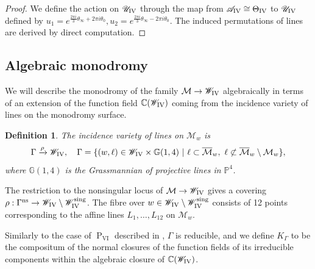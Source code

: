 \documentclass[a4paper,reqno]{amsart}
\numberwithin{equation}{section}
\newcommand{\C}{\mathbb{C}}
\newcommand{\p}{\mathbb{P}}
\newcommand{\pain}[1]{\operatorname{P}_{\mathrm{#1}}}
\newtheorem{definition}[theorem]{Definition}
\numberwithin{equation}{section}
\begin{document}
\begin{proof}
     
    We define the action on $\mathscr{U}_{\rm{IV}}$ through the map from $\mathscr{A}_{\rm{IV}}\cong\Theta_{\rm{IV}}$  to $\mathscr{U}_{\rm{IV}}$ defined by $u_1=e^{ \frac{2\pi i}{3}\theta_\infty+ 2 \pi i\theta_0},  u_2=e^{\frac{2\pi i}{3}\theta_\infty-2\pi i\theta_0}$.
        The induced permutations of lines are derived by direct computation.
\end{proof}

\subsection{Algebraic monodromy}
\label{subsec:algmonodromyPIV}
We will describe the monodromy of the family $\mathcal{M}\to \mathscr{W}_{\rm{IV}}$ algebraically in terms of an extension of the function field $\C(\mathscr{W}_{\rm{IV}})$ coming from the incidence variety of lines on the monodromy surface.

\begin{definition}
    The incidence variety of lines on $\mathcal{M}_w$ is 
    \begin{equation*}
        \Gamma\xrightarrow{\rho} \mathscr{W}_{\rm{IV}}, \quad\Gamma = \{ (w,\ell)\in \mathscr{W}_{\rm{IV}} \times \mathbb{G}(1,4)~|~\ell \subset \overline{\mathcal{M}}_w, \,\, \ell \not\subset \overline{\mathcal{M}}_w\setminus \mathcal{M}_w\},
    \end{equation*}
    where $\mathbb{G}(1,4)$ is the Grassmannian of projective lines in $\p^4$.
\end{definition}

The restriction to the nonsingular locus of $\mathcal{M}\to\mathscr{W}_{\rm{IV}}$ gives a covering $\rho : \Gamma^{\operatorname{ns}}\to \mathscr{W}_{\rm{IV}}\setminus \mathscr{W}_{\rm{IV}}^{\operatorname{sing}}$.
The fibre over $w\in \mathscr{W}_{\rm{IV}}\setminus \mathscr{W}_{\rm{IV}}^{\operatorname{sing}}$ consists of 12 points corresponding to the affine lines $L_{1},\dots,L_{12}$ on $\mathcal{M}_{w}$.

Similarly to the case of $\pain{VI}$ described in , $\Gamma$ is reducible, and we define $K_{\Gamma}$ to be the compositum of the normal closures of the function fields of its irreducible components within the algebraic closure of $\C(\mathscr{W}_{\rm{IV}})$. 
\end{document}
